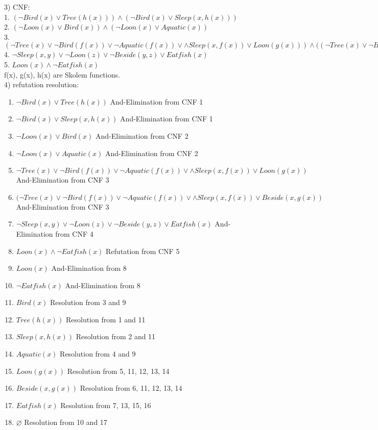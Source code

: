 \documentclass[a4paper]{article}
\begin{document}
3) CNF:\\
1. $(\neg Bird(x) \vee Tree(h(x))) \wedge (\neg Bird(x) \vee Sleep(x, h(x)))$\\
2. $(\neg Loon(x) \vee Bird(x)) \wedge (\neg Loon(x) \vee Aquatic(x))$\\
3. $(\neg Tree(x) \vee \neg Bird(f(x)) \vee \neg Aquatic(f(x)) \vee \wedge Sleep(x, f(x)) \vee Loon(g(x))) \wedge ((\neg Tree(x) \vee \neg Bird(f(x)) \vee \neg Aquatic(f(x)) \vee \wedge Sleep(x, f(x)) \vee Beside(x, g(x)))$\\
4. $\neg Sleep(x, y) \vee \neg Loon(z) \vee \neg Beside(y, z) \vee Eatfish(x)$\\
5. $Loon(x) \wedge \neg Eatfish(x)$\\
f(x), g(x), h(x) are Skolem functions.\\

4) refutation resolution:\\
\begin{enumerate}[1.]
    \item $\neg Bird(x) \vee Tree(h(x))$ \hfill And-Elimination from CNF 1
    \item $\neg Bird(x) \vee Sleep(x, h(x))$ \hfill And-Elimination from CNF 1
    \item $\neg Loon(x) \vee Bird(x)$ \hfill And-Elimination from CNF 2
    \item $\neg Loon(x) \vee Aquatic(x)$ \hfill And-Elimination from CNF 2
    \item $\neg Tree(x) \vee \neg Bird(f(x)) \vee \neg Aquatic(f(x)) \vee \wedge Sleep(x, f(x)) \vee Loon(g(x))$ \hfill And-Elimination from CNF 3
    \item $(\neg Tree(x) \vee \neg Bird(f(x)) \vee \neg Aquatic(f(x)) \vee \wedge Sleep(x, f(x)) \vee Beside(x, g(x))$ \hfill And-Elimination from CNF 3
    \item $\neg Sleep(x, y) \vee \neg Loon(z) \vee \neg Beside(y, z) \vee Eatfish(x)$ \hfill And-Elimination from CNF 4
    \item $Loon(x) \wedge \neg Eatfish(x)$ \hfill Refutation from CNF 5
    \item $Loon(x)$ \hfill And-Elimination from 8
    \item $\neg Eatfish(x)$ \hfill And-Elimination from 8
    \item $Bird(x)$ \hfill Resolution from 3 and 9
    \item $Tree(h(x))$ \hfill Resolution from 1 and 11
    \item $Sleep(x, h(x))$ \hfill Resolution from 2 and 11
    \item $Aquatic(x)$ \hfill Resolution from 4 and 9
    \item $Loon(g(x))$ \hfill Resolution from 5, 11, 12, 13, 14
    \item $Beside(x, g(x))$ \hfill Resolution from 6, 11, 12, 13, 14
    \item $Eatfish(x)$ \hfill Resolution from 7, 13, 15, 16
    \item $\varnothing$ \hfill Resolution from 10 and 17
\end{enumerate}
\end{document}
